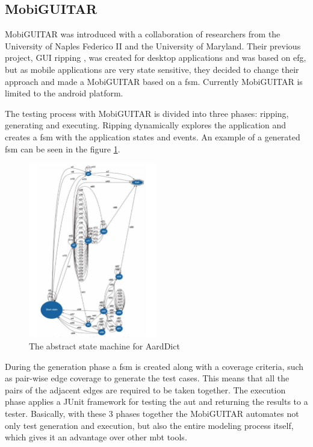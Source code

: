 \subsection{MobiGUITAR}
\par
MobiGUITAR \cite{MobiGUITAR} was introduced with a collaboration of researchers from the University of Naples Federico II and the University of Maryland. Their previous project, GUI ripping \cite{GUIripping}, was created for desktop applications and was based on \acrshort{efg}, but as mobile applications are very state sensitive, they decided to change their approach and made a MobiGUITAR based on a \acrshort{fsm}. Currently MobiGUITAR is limited to the android platform.

\par
The testing process with MobiGUITAR is divided into three phases: ripping, generating and executing. Ripping dynamically explores the application and creates a \acrshort{fsm} with the application states and events. An example of a generated \acrshort{fsm} can be seen in the figure \ref{Fig:MobiGuitar}.

\begin{figure} [htbp!]
	\centering
					\includegraphics[width=0.5\textwidth]{figures/mobiguitar.JPG}
					\caption{\label{Fig:MobiGuitar} The abstract state machine for AardDict\cite{MobiGUITAR}}
\end{figure}

During the generation phase a \acrshort{fsm} is created along with a coverage criteria, such as pair-wise edge coverage to generate the test cases. This means that all the pairs of the adjacent edges are required to be taken together.
The execution phase applies a JUnit framework for testing the \acrshort{aut} and returning the results to a tester. Basically, with these 3 phases together the MobiGUITAR automates not only test generation and execution, but also the entire modeling process itself, which gives it an advantage over other \acrshort{mbt} tools.

